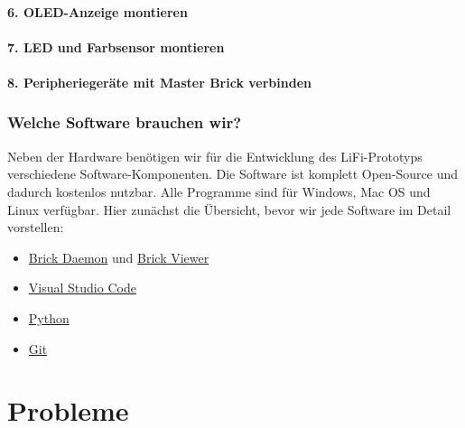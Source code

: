 \documentclass[
  letterpaper,
  DIV=11]{scrreprt}
\begin{document}
\subsection*{6. OLED-Anzeige montieren}\label{oled-anzeige-montieren}

\subsection*{7. LED und Farbsensor
montieren}\label{led-und-farbsensor-montieren}

\subsection*{8. Peripheriegeräte mit Master Brick
verbinden}\label{peripheriegeruxe4te-mit-master-brick-verbinden}

\section*{Welche Software brauchen
wir?}\label{welche-software-brauchen-wir}


Neben der Hardware benötigen wir für die Entwicklung des LiFi-Prototyps
verschiedene Software-Komponenten. Die Software ist komplett Open-Source
und dadurch kostenlos nutzbar. Alle Programme sind für Windows, Mac OS
und Linux verfügbar. Hier zunächst die Übersicht, bevor wir jede
Software im Detail vorstellen:

\begin{itemize}
\item
  \href{https://www.tinkerforge.com/en/doc/Software/Brickd.html}{Brick
  Daemon} und
  \href{https://www.tinkerforge.com/en/doc/Software/Brickv.html}{Brick
  Viewer}
\item
  \href{https://code.visualstudio.com/download}{Visual Studio Code}
\item
  \href{https://www.python.org/downloads/}{Python}
\item
  \href{https://git-scm.com/downloads}{Git}
\end{itemize}

\part{Probleme}
\end{document}
